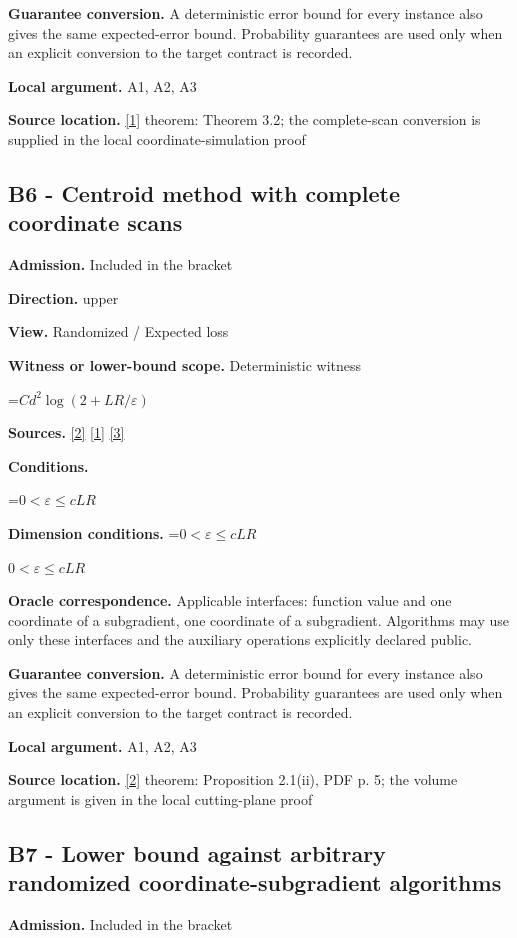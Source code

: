 \documentclass[10pt,a4paper]{article}
\newcommand{\AtlasMath}[1]{\par\begingroup\centering\setbox0=\hbox{$\displaystyle #1$}\ifdim\wd0>1.4\linewidth\typeout{ATLAS WIDE FORMULA: \the\wd0}\fi\ifdim\wd0>\linewidth\resizebox{\linewidth}{!}{\box0}\else\box0\fi\par\endgroup}
\newcommand{\AtlasInlineMath}[1]{\begingroup\setbox0=\hbox{$#1$}\ifdim\wd0>.4\linewidth\endgroup\AtlasMath{#1}\else\endgroup$#1$\fi}
\begin{document}
\textbf{Guarantee conversion.} A deterministic error bound for every instance also gives the same expected-error bound. Probability guarantees are used only when an explicit conversion to the target contract is recorded.

\textbf{Local argument.} A1, A2, A3

\textbf{Source location.} \href{https://arxiv.org/pdf/1405.4980}{[1]} theorem: Theorem 3.2; the complete-scan conversion is supplied in the local coordinate-simulation proof

\subsection{B6 - Centroid method with complete coordinate scans}
\textbf{Admission.} Included in the bracket

\textbf{Direction.} upper

\textbf{View.} Randomized / Expected loss

\textbf{Witness or lower-bound scope.} Deterministic witness

\AtlasMath{Cd^2\log(2+LR/\varepsilon)}
\textbf{Sources.} \href{https://www2.isye.gatech.edu/~nemirovs/MOR_AccuracyCertificates.pdf}{[2]} \href{https://arxiv.org/pdf/1405.4980}{[1]} \href{https://arxiv.org/pdf/2609.20701}{[3]}

\textbf{Conditions.} 
\AtlasMath{0<\varepsilon\le cLR}


\textbf{Dimension conditions.} \AtlasInlineMath{0<\varepsilon\le cLR}

\textbf{Oracle correspondence.} Applicable interfaces: function value and one coordinate of a subgradient, one coordinate of a subgradient. Algorithms may use only these interfaces and the auxiliary operations explicitly declared public.

\textbf{Guarantee conversion.} A deterministic error bound for every instance also gives the same expected-error bound. Probability guarantees are used only when an explicit conversion to the target contract is recorded.

\textbf{Local argument.} A1, A2, A3

\textbf{Source location.} \href{https://www2.isye.gatech.edu/~nemirovs/MOR_AccuracyCertificates.pdf}{[2]} theorem: Proposition 2.1(ii), PDF p. 5; the volume argument is given in the local cutting-plane proof

\subsection{B7 - Lower bound against arbitrary randomized coordinate-subgradient algorithms}
\textbf{Admission.} Included in the bracket
\end{document}
